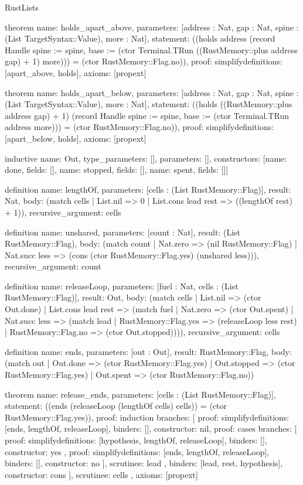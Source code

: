 \begin{lexlean}{RustLists}
\begin{semanticmodule}
theorem{
  name: holds_apart_above,
  parameters: [address : Nat, gap : Nat, spine : (List TargetSyntax::Value), more : Nat],
  statement: ((holds address (record Handle {spine := spine, base := (ctor Terminal.TRun ((RustMemory::plus address gap) + 1) more)})) = (ctor RustMemory::Flag.no)),
  proof: simplify{definitions: [apart_above, holds]},
  axioms: [propext]
}

theorem{
  name: holds_apart_below,
  parameters: [address : Nat, gap : Nat, spine : (List TargetSyntax::Value), more : Nat],
  statement: ((holds ((RustMemory::plus address gap) + 1) (record Handle {spine := spine, base := (ctor Terminal.TRun address more)})) = (ctor RustMemory::Flag.no)),
  proof: simplify{definitions: [apart_below, holds]},
  axioms: [propext]
}

inductive{
  name: Out,
  type_parameters: [],
  parameters: [],
  constructors: [{name: done, fields: []}, {name: stopped, fields: []}, {name: spent, fields: []}]
}

definition{
  name: lengthOf,
  parameters: [cells : (List RustMemory::Flag)],
  result: Nat,
  body: (match cells | List.nil => 0 | List.cons lead rest => ((lengthOf rest) + 1)),
  recursive_argument: cells
}

definition{
  name: unshared,
  parameters: [count : Nat],
  result: (List RustMemory::Flag),
  body: (match count
    | Nat.zero => (nil RustMemory::Flag)
    | Nat.succ less => (cons (ctor RustMemory::Flag.yes) (unshared less))),
  recursive_argument: count
}

definition{
  name: releaseLoop,
  parameters: [fuel : Nat, cells : (List RustMemory::Flag)],
  result: Out,
  body: (match cells
    | List.nil => (ctor Out.done)
    | List.cons lead rest => (match fuel
      | Nat.zero => (ctor Out.spent)
      | Nat.succ less => (match lead
        | RustMemory::Flag.yes => (releaseLoop less rest)
        | RustMemory::Flag.no => (ctor Out.stopped)))),
  recursive_argument: cells
}

definition{
  name: ends,
  parameters: [out : Out],
  result: RustMemory::Flag,
  body: (match out
    | Out.done => (ctor RustMemory::Flag.yes)
    | Out.stopped => (ctor RustMemory::Flag.yes)
    | Out.spent => (ctor RustMemory::Flag.no))
}

theorem{
  name: release_ends,
  parameters: [cells : (List RustMemory::Flag)],
  statement: ((ends (releaseLoop (lengthOf cells) cells)) = (ctor RustMemory::Flag.yes)),
  proof: induction{
    branches: [
      {proof: simplify{definitions: [ends, lengthOf, releaseLoop]}, binders: [], constructor: nil},
      {
        proof: cases{
          branches: [
            {
              proof: simplify{definitions: [hypothesis, lengthOf, releaseLoop]},
              binders: [],
              constructor: yes
            },
            {
              proof: simplify{definitions: [ends, lengthOf, releaseLoop]},
              binders: [],
              constructor: no
            }
          ],
          scrutinee: lead
        },
        binders: [lead, rest, hypothesis],
        constructor: cons
      }
    ],
    scrutinee: cells
  },
  axioms: [propext]
}


\end{semanticmodule}
\end{lexlean}
